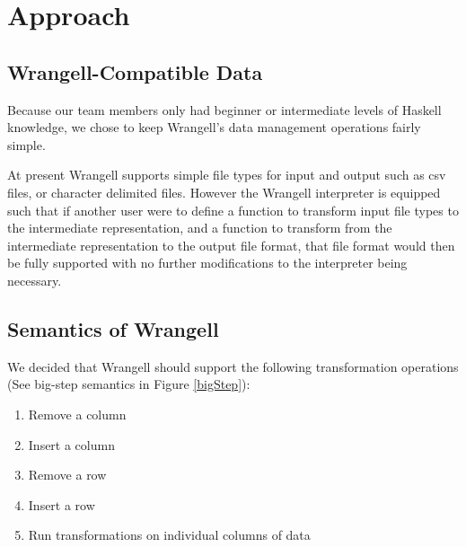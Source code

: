 \documentclass[preprint,nocopyrightspace]{sig-alternate}
\begin{document}
\section{Approach}

\subsection{Wrangell-Compatible Data}
Because our team members only had beginner or intermediate levels of Haskell knowledge, we chose to keep Wrangell's data management operations fairly simple. 

\begin{comment}
As a result, Wrangell's application subjects are limited to tables of data wherein columns are separated by either a comma or a user-specified delimiter. Furthermore, we allow the first row of data in a csv file to be a list of comma-separated labels, one for each column. We require that each column have a \emph{unique} label, to avoid ambiguity in potential future Wrangell features which may seek to identify columns per their labels. We decided to ultimately apply Wrangell to a variety of csv files. See Figure \ref{exampleTable} for an example of a Wrangell-compatible data table. 
\end{comment}
At present Wrangell supports simple file types for input and output such as csv files, or character delimited files. However the Wrangell interpreter is equipped such that if another user were to define a function to transform input file types to the intermediate representation, and a function to transform from the intermediate representation to the output file format, that file format would then be fully supported with no further modifications to the interpreter being necessary.


\subsection{Semantics of Wrangell}
We decided that Wrangell should support the following transformation operations (See big-step semantics in Figure \ref{bigStep}):
\begin{enumerate}
\item Remove a column
\item Insert a column
\item Remove a row
\item Insert a row
\item Run transformations on individual columns of data
\end{enumerate}
\end{document}
